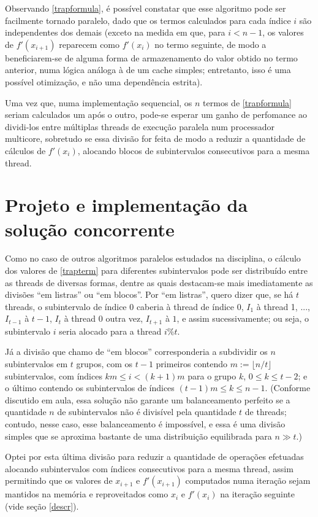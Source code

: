 \documentclass{article}
\begin{document}
  Observando \eqref{trapformula}, é possível constatar que esse algoritmo pode ser facilmente tornado paralelo, dado que os termos calculados para cada índice $i$ são independentes dos demais (exceto na medida em que, para $i < n - 1$, os valores de $f'(x_{i+1})$ reparecem como $f'(x_i)$ no termo seguinte, de modo a beneficiarem-se de alguma forma de armazenamento do valor obtido no termo anterior, numa lógica análoga à de um cache simples; entretanto, isso é uma possível otimização, e não uma dependência estrita).
  
  Uma vez que, numa implementação sequencial, os $n$ termos de \eqref{trapformula} seriam calculados um após o outro, pode-se esperar um ganho de perfomance ao dividi-los entre múltiplas threads de execução paralela num processador multicore, sobretudo se essa divisão for feita de modo a reduzir a quantidade de cálculos de $f'(x_i)$, alocando blocos de subintervalos consecutivos para a mesma thread.

  \section{Projeto e implementação da solução concorrente}

  Como no caso de outros algoritmos paralelos estudados na disciplina, o cálculo dos valores de \eqref{trapterm} para diferentes subintervalos pode ser distribuído entre as threads de diversas formas, dentre as quais destacam-se mais imediatamente as divisões ``em listras'' ou ``em blocos''. Por ``em listras'', quero dizer que, se há $t$ threads, o subintervalo de índice 0 caberia à thread de índice 0, $I_1$ à thread 1, ..., $I_{t - 1}$ à $t-1$, $I_{t}$ à thread 0 outra vez, $I_{t + 1}$ à $1$, e assim sucessivamente; ou seja, o subintervalo $i$ seria alocado para a thread $i \% t$.

  Já a divisão que chamo de ``em blocos'' corresponderia a subdividir os $n$ subintervalos em $t$ grupos, com os $t - 1$ primeiros contendo $m := \lfloor n/t \rfloor$ subintervalos, com índices $ k m \leq i < (k+1) m$ para o grupo $k$, $0 \leq k \leq t-2$; e o último contendo os subintervalos de índices $(t-1)m \leq k \leq n - 1$. (Conforme discutido em aula, essa solução não garante um balanceamento perfeito se a quantidade $n$ de subintervalos não é divisível pela quantidade $t$ de threads; contudo, nesse caso, esse balanceamento é impossível, e essa é uma divisão simples que se aproxima bastante de uma distribuição equilibrada para $n \gg t$.)

  Optei por esta última divisão para reduzir a quantidade de operações efetuadas alocando subintervalos com índices consecutivos para a mesma thread, assim permitindo que os valores de $x_{i+1}$ e $f'(x_{i+1})$ computados numa iteração sejam mantidos na memória e reproveitados como $x_i$ e $f'(x_i)$ na iteração seguinte (vide seção \ref{descr}).
\end{document}
